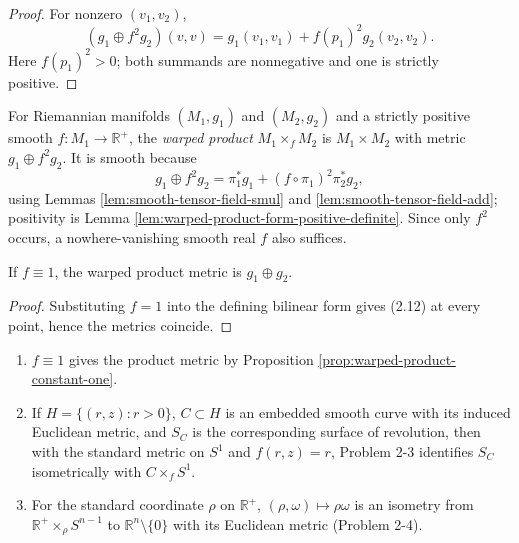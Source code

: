 \begin{proof}
\leanok
{}
\sketch For nonzero $(v_1,v_2)$,
\[
(g_1\oplus f^2g_2)(v,v)=g_1(v_1,v_1)+f(p_1)^2g_2(v_2,v_2).
\]
Here $f(p_1)^2>0$; both summands are nonnegative and one is strictly positive.
\end{proof}

\begin{definition}
\label{def:warped-product}
\leanok
{}
For Riemannian manifolds $(M_1,g_1)$ and $(M_2,g_2)$ and a strictly positive smooth $f:M_1\to\mathbb R^+$, the \emph{warped product} $M_1\times_fM_2$ is $M_1\times M_2$ with metric $g_1\oplus f^2g_2$. It is smooth because
\[
g_1\oplus f^2g_2=\pi_1^*g_1+(f\circ\pi_1)^2\pi_2^*g_2,
\]
using Lemmas \ref{lem:smooth-tensor-field-smul} and \ref{lem:smooth-tensor-field-add}; positivity is Lemma \ref{lem:warped-product-form-positive-definite}. Since only $f^2$ occurs, a nowhere-vanishing smooth real $f$ also suffices.
\end{definition}

\begin{proposition}
\label{prop:warped-product-constant-one}
\leanok
{}
If $f\equiv1$, the warped product metric is $g_1\oplus g_2$.
\end{proposition}

\begin{proof}
\leanok
{}
\sketch Substituting $f=1$ into the defining bilinear form gives (2.12) at every point, hence the metrics coincide.
\end{proof}

\begin{example}
\label{ex:warped-products}
\begin{enumerate}
\item[(a)] $f\equiv1$ gives the product metric by Proposition \ref{prop:warped-product-constant-one}.
\item[(b)] If $H=\{(r,z):r>0\}$, $C\subset H$ is an embedded smooth curve with its induced Euclidean metric, and $S_C$ is the corresponding surface of revolution, then with the standard metric on $S^1$ and $f(r,z)=r$, Problem 2-3 identifies $S_C$ isometrically with $C\times_fS^1$.
\item[(c)] For the standard coordinate $\rho$ on $\mathbb R^+$, $(\rho,\omega)\mapsto\rho\omega$ is an isometry from $\mathbb R^+\times_\rho S^{n-1}$ to $\mathbb R^n\setminus\{0\}$ with its Euclidean metric (Problem 2-4).
\end{enumerate}
\end{example}

